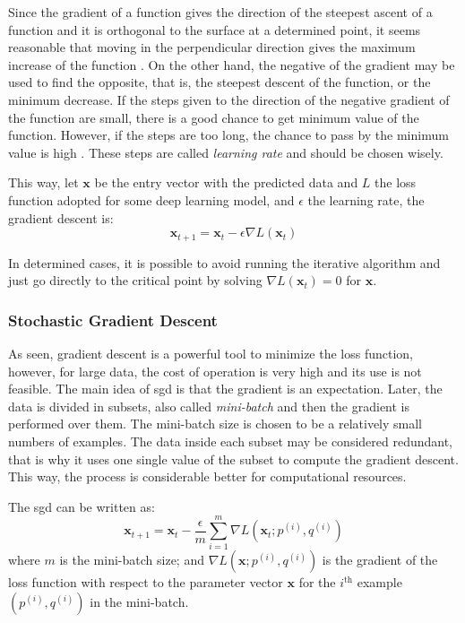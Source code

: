 Since the gradient of a function gives the direction of the steepest ascent of a function and it is orthogonal to the surface at a determined point, it seems reasonable that moving in the perpendicular direction gives the maximum increase of the function \citep{stewart2016}.
On the other hand, the negative of the gradient may be used to find the opposite, that is, the steepest descent of the function, or the minimum decrease.
If the steps given to the direction of the negative gradient of the function are small, there is a good chance to get minimum value of the function.
However, if the steps are too long, the chance to pass by the minimum value is high \citep{nielsen2015}.
These steps are called \emph{learning rate} and should be chosen wisely.

This way, let \(\mathbf{x}\) be the entry vector with the predicted data and \(L\) the loss function adopted for some deep learning model, and \(\epsilon\) the learning rate, the gradient descent is:
%
\begin{equation}
    \mathbf{x}_{t+1} = \mathbf{x}_t - \epsilon \nabla L(\mathbf{x}_t)
\end{equation}

In determined cases, it is possible to avoid running the iterative algorithm and just go directly to the critical point by solving \(\nabla L(\mathbf{x}_t) = 0\) for \(\mathbf{x}\).

\subsubsection*{Stochastic Gradient Descent}

As seen, gradient descent is a powerful tool to minimize the loss function, however, for large data, the cost of operation is very high and its use is not feasible. 
The main idea of \gls*{sgd} is that the gradient is an expectation.
Later, the data is divided in subsets, also called \emph{mini-batch} and then the gradient is performed over them.
The mini-batch size is chosen to be a relatively small numbers of examples.
The data inside each subset may be considered redundant, that is why it uses one single value of the subset to compute the gradient descent.
This way, the process is considerable better for computational resources.

The \gls*{sgd} can be written as:
%
\begin{equation}
    \mathbf{x}_{t+1} = \mathbf{x}_t - \frac{\epsilon}{m} \sum_{i=1}^m \nabla L(\mathbf{x}_t; p^{(i)},q^{(i)})
\end{equation}
%
where \(m\)  is the mini-batch size; and \(\nabla L(\mathbf{x}; p^{(i)}, q^{(i)})\) is the gradient of the loss function with respect to the parameter vector \(\mathbf{x}\) for the \(i^{\text{th}}\) example \((p^{(i)}, q^{(i)})\) in the mini-batch.

